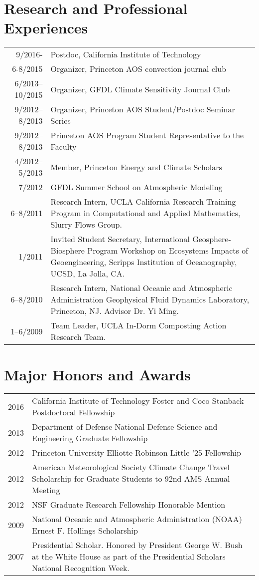 \documentclass{article}
\begin{document}
\section*{Research and Professional Experiences}
\label{sec:orgheadline9}
\begin{center}
\begin{tabularx}{\textwidth}{rX}
9/2016- & Postdoc, California Institute of Technology\\
6-8/2015 & Organizer, Princeton AOS convection journal club\\
6/2013–10/2015 & Organizer, GFDL Climate Sensitivity Journal Club\\
9/2012–8/2013 & Organizer, Princeton AOS Student/Postdoc Seminar Series\\
9/2012–8/2013 & Princeton AOS Program Student Representative to the Faculty\\
4/2012–5/2013 & Member, Princeton Energy and Climate Scholars\\
7/2012 & GFDL Summer School on Atmospheric Modeling\\
6–8/2011 & Research Intern, UCLA California Research Training Program in Computational and Applied Mathematics, Slurry Flows Group.\\
1/2011 & Invited Student Secretary, International Geosphere-Biosphere Program Workshop on Ecosystems Impacts of Geoengineering, Scripps Institution of Oceanography, UCSD, La Jolla, CA.\\
6–8/2010 & Research Intern, National Oceanic and Atmospheric Administration Geophysical Fluid Dynamics Laboratory, Princeton, NJ. Advisor Dr. Yi Ming.\\
1–6/2009 & Team Leader, UCLA In-Dorm Composting Action Research Team.\\
\end{tabularx}
\end{center}
\section*{Major Honors and Awards}
\label{sec:orgheadline10}
\begin{center}
\begin{tabularx}{\textwidth}{lX}
2016 & California Institute of Technology Foster and Coco Stanback Postdoctoral Fellowship & \\
2013 & Department of Defense National Defense Science and Engineering Graduate Fellowship & \\
2012 & Princeton University Elliotte Robinson Little '25 Fellowship & \\
2012 & American Meteorological Society Climate Change Travel Scholarship for Graduate Students to 92nd AMS Annual Meeting & \\
2012 & NSF Graduate Research Fellowship Honorable Mention & \\
2009 & National Oceanic and Atmospheric Administration (NOAA) Ernest F. Hollings Scholarship & \\
2007 & Presidential Scholar.  Honored by President George W. Bush at the White House as part of the Presidential Scholars National Recognition Week. & \\
\end{tabularx}
\end{center}
\end{document}
